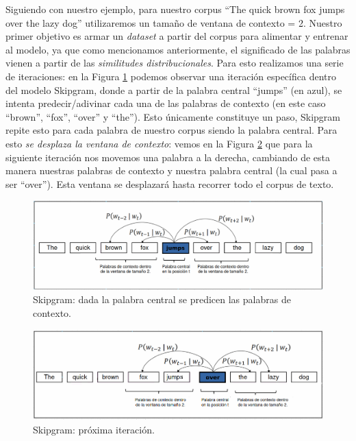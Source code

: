 \documentclass[12pt,a4paper]{article}
\begin{document}
\begin{sloppypar}
Siguiendo con nuestro ejemplo, para nuestro corpus “The quick brown fox jumps over the lazy dog” utilizaremos un tamaño de ventana de contexto = 2.  Nuestro primer objetivo es armar un \textit{dataset} a partir del corpus para alimentar y entrenar al modelo, ya que como mencionamos anteriormente, el significado de las palabras vienen a partir de las \textit{similitudes distribucionales}. Para esto realizamos una serie de iteraciones: en la Figura \ref{fig:Imagen_NLP_19} podemos observar una iteración específica dentro del modelo Skipgram, donde a partir de la palabra central “jumps” (en azul), se intenta predecir/adivinar cada una de las palabras de contexto (en este caso “brown”, “fox”, “over” y “the”).  Esto únicamente constituye un paso, Skipgram repite esto para cada palabra de nuestro corpus siendo la palabra central. Para esto \textit{se desplaza la ventana de contexto}: vemos en la Figura \ref{fig:Imagen_NLP_20}  que para la siguiente iteración nos movemos una palabra a la derecha, cambiando de esta manera nuestras palabras de contexto y nuestra palabra central (la cual pasa a ser “over”). Esta ventana se desplazará hasta recorrer todo el corpus de texto.

\begin{figure}[H]    
 \centering
 \includegraphics[width=1\textwidth]{images/NLP/19.png}
 \captionsetup{justification=centering,margin=3cm}
 \caption{Skipgram: dada la palabra central se predicen las palabras de contexto.}
 \label{fig:Imagen_NLP_19}
\end{figure}

\begin{figure}[H]    
 \centering
 \includegraphics[width=1\textwidth]{images/NLP/20.png}
 \caption{Skipgram: próxima iteración.}
 \label{fig:Imagen_NLP_20}
\end{figure}


\end{sloppypar}
\end{document}
